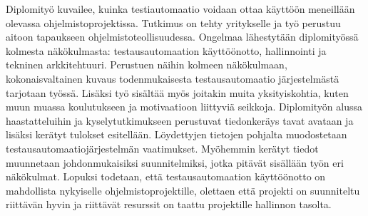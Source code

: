 Diplomityö kuvailee, kuinka testiautomaatio voidaan ottaa käyttöön meneillään olevassa ohjelmistoprojektissa. Tutkimus on tehty yritykselle ja työ perustuu aitoon tapaukseen ohjelmistoteollisuudessa. Ongelmaa lähestytään diplomityössä kolmesta näkökulmasta: testausautomaation käyttöönotto, hallinnointi ja tekninen arkkitehtuuri. Perustuen näihin kolmeen näkökulmaan, kokonaisvaltainen kuvaus todenmukaisesta testausautomaatio järjestelmästä tarjotaan työssä. Lisäksi työ sisältää myös joitakin muita yksityiskohtia, kuten muun muassa koulutukseen ja motivaatioon liittyviä seikkoja. Diplomityön alussa haastatteluihin ja kyselytutkimukseen perustuvat tiedonkeräys tavat avataan ja lisäksi kerätyt tulokset esitellään. Löydettyjen tietojen pohjalta muodostetaan testausautomaatiojärjestelmän vaatimukset. Myöhemmin kerätyt tiedot muunnetaan johdonmukaisiksi suunnitelmiksi, jotka pitävät sisällään työn eri näkökulmat. Lopuksi todetaan, että testausautomaation käyttöönotto on mahdollista nykyiselle ohjelmistoprojektille, olettaen että projekti on suunniteltu riittävän hyvin ja riittävät resurssit on taattu projektille hallinnon tasolta.